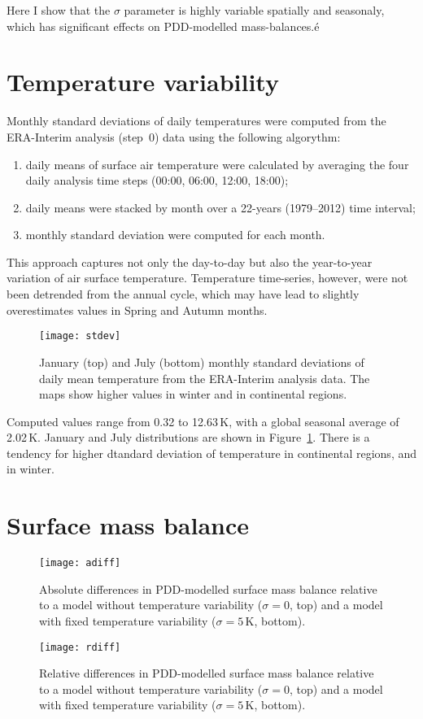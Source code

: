 \documentclass[twocolumn]{igs}
\begin{document}
Here I show that the $\sigma$ parameter is highly variable spatially and seasonaly, which has significant effects on PDD-modelled mass-balances.é

\section{Temperature variability}

Monthly standard deviations of daily temperatures were computed from the ERA-Interim\citep{data:erai} analysis (step~0) data using the following algorythm:

\begin{enumerate}
  \item daily means of surface air temperature were calculated by averaging the four daily analysis time steps (00:00, 06:00, 12:00, 18:00);
  \item daily means were stacked by month over a 22-years (1979--2012) time interval;
  \item monthly standard deviation were computed for each month.
\end{enumerate}

This approach captures not only the day-to-day but also the year-to-year variation of air surface temperature. Temperature time-series, however, were not been detrended from the annual cycle, which may have lead to slightly overestimates values in Spring and Autumn months.

\begin{figure}
  \centering\texttt{[image: stdev]}
  \caption{January (top) and July (bottom) monthly standard deviations of daily mean temperature from the ERA-Interim analysis data. The maps show higher values in winter and in continental regions.}
  \label{fig:stdev}
\end{figure}

Computed values range from 0.32 to 12.63\,K, with a global seasonal average of 2.02\,K. January and July distributions are shown in Figure~\ref{fig:stdev}. There is a tendency for higher dtandard deviation of temperature in continental regions, and in winter.

\section{Surface mass balance}

\begin{figure}
  \centering\texttt{[image: adiff]}
  \caption{Absolute differences in PDD-modelled surface mass balance relative to a model without temperature variability ($\sigma=0$, top) and a model with fixed temperature variability ($\sigma=5\,\mathrm{K}$, bottom).}
  \label{fig:adiff}
\end{figure}

\begin{figure}
  \centering\texttt{[image: rdiff]}
  \caption{Relative differences in PDD-modelled surface mass balance relative to a model without temperature variability ($\sigma=0$, top) and a model with fixed temperature variability ($\sigma=5\,\mathrm{K}$, bottom).}
  \label{fig:rdiff}
\end{figure}



\end{document}
